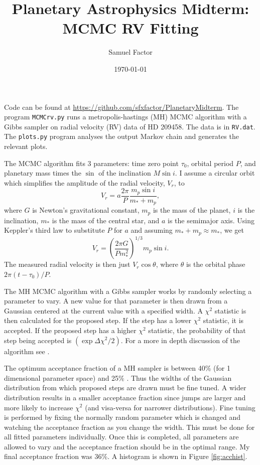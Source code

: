\documentclass[11pt]{paper}
\title{Planetary Astrophysics Midterm:\\MCMC RV Fitting}
\author{Samuel Factor}
\date\today{}                                           %
\begin{document}
\maketitle

Code can be found at \url{https://github.com/sfxfactor/PlanetaryMidterm}. The program \texttt{MCMCrv.py} runs a metropolis-hastings (MH) MCMC algorithm with a Gibbs sampler on radial velocity (RV) data of HD 209458. The data is in \texttt{RV.dat}. The \texttt{plots.py} program analyses the output Markov chain and generates the relevant plots.

The MCMC algorithm fits 3 parameters: time zero point $\tau_0$, orbital period $P$, and planetary mass times the $\sin$ of the inclination $M\sin i$. I assume a circular orbit \citep[the actual value of $e$ is $0.0082^{+0.0078}_{-0.0082}$,][]{e} which simplifies the amplitude of the radial velocity, $V_r$, to 
\begin{equation}\label{eq:RVa}
    V_r=a\frac{2\pi}{P}\frac{m_p\sin i}{m_*+m_p},
\end{equation}
where $G$ is Newton's gravitational constant, $m_p$ is the mass of the planet, $i$ is the inclination, $m_*$ is the mass of the central star, and $a$ is the semimajor axis. Using Keppler's third law to substitute $P$ for $a$ and assuming $m_*+m_p\approx m_*$, we get
\begin{equation}\label{eq:RV}
    V_r=\left(\frac{2\pi G}{P m_*^2}\right)^{1/3}m_p\sin i.
\end{equation}
The measured radial velocity is then just $V_r\cos\theta$, where $\theta$ is the orbital phase $2\pi(t-\tau_0)/P$.

The MH MCMC algorithm with a Gibbs sampler works by randomly selecting a parameter to vary. A new value for that parameter is then drawn from a Gaussian centered at the current value with a specified width. A $\chi^2$ statistic is then calculated for the proposed step. If the step has a lower $\chi^2$ statistic, it is accepted. If the proposed step has a higher $\chi^2$ statistic, the probability of that step being accepted is $(\exp{\Delta\chi^2/2})$. For a more in depth discussion of the algorithm see \citet{ford}.

The optimum acceptance fraction of a MH sampler is between 40\% (for 1 dimensional parameter space) and 25\% \citep[for many dimensions,][]{baye,convF}. Thus the widths of the Gaussian distribution from which proposed steps are drawn must be fine tuned. A wider distribution results in a smaller acceptance fraction since jumps are larger and more likely to increase $\chi^2$ (and visa-versa for narrower distributions). Fine tuning is performed by fixing the normally random parameter which is changed and watching the acceptance fraction as you change the width. This must be done for all fitted parameters individually. Once this is completed, all parameters are allowed to vary and the acceptance fraction should be in the optimal range. My final acceptance fraction was 36\%. A histogram is shown in Figure \ref{fig:acchist}.
\end{document}
